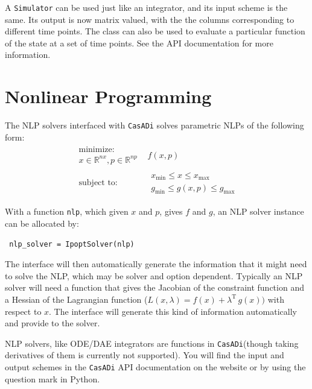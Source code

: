 \documentclass[a4paper,12pt]{book}
\newcommand{\CasADi}{\texttt{CasADi}\xspace}
\begin{document}
A \texttt{Simulator} can be used just like an integrator, and its input scheme is the same. Its output is now matrix valued, with the the columns corresponding to different time points. The class can also be used to evaluate a particular function of the state at a set of time points. See the API documentation for more information.

\chapter{Nonlinear Programming}
The NLP solvers interfaced with \CasADi solves parametric NLPs of the following form:
\begin{equation}
\begin{array}{cc}
\begin{array}{c}
\text{minimize:} \\
x \in \mathbb{R}^{nx}, p \in \mathbb{R}^{np}
\end{array}
&
f(x,p)
\\
\begin{array}{c}
\text{subject to:}
\end{array}
&
\begin{array}{c}
x_{\min} \le x \le x_{\max} \\
g_{\min} \le g(x,p) \le g_{\max}
\end{array}
\end{array}
\end{equation}

With a function \texttt{nlp}, which given $x$ and $p$, gives $f$ and $g$, an NLP solver instance can be allocated by:
\begin{verbatim}
 nlp_solver = IpoptSolver(nlp)
\end{verbatim}

The interface will then automatically generate the information that it might need to solve the NLP, which may be solver and option dependent. Typically an NLP solver will need a function that gives the Jacobian of the constraint function and a Hessian of the Lagrangian function ($L(x,\lambda) = f(x) + \lambda^{\text{T}} \, g(x))$ with respect to $x$. The interface will generate this kind of information automatically and provide to the solver.

NLP solvers, like ODE/DAE integrators are functions in \CasADi (though taking derivatives of them is currently not supported). You will find the input and output schemes in the \CasADi API documentation on the website or by using the question mark in Python.
\end{document}
